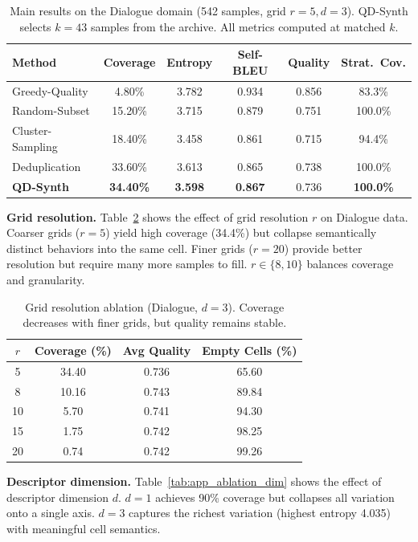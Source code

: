 \documentclass{article}
\begin{document}
\begin{enumerate}[nosep]
\begin{table}[h]
\centering
\caption{Main results on the Dialogue domain (542 samples, grid $r=5, d=3$). QD-Synth selects $k=43$ samples from the archive. All metrics computed at matched $k$.}
\label{tab:main_dialogue}
\begin{tabular}{lccccc}
\toprule
\textbf{Method} & \textbf{Coverage} & \textbf{Entropy} & \textbf{Self-BLEU} & \textbf{Quality} & \textbf{Strat.\ Cov.} \\
\midrule
Greedy-Quality & 4.80\% & 3.782 & 0.934 & 0.856 & 83.3\% \\
Random-Subset & 15.20\% & 3.715 & 0.879 & 0.751 & 100.0\% \\
Cluster-Sampling & 18.40\% & 3.458 & 0.861 & 0.715 & 94.4\% \\
Deduplication & 33.60\% & 3.613 & 0.865 & 0.738 & 100.0\% \\
\textbf{QD-Synth} & \textbf{34.40\%} & \textbf{3.598} & \textbf{0.867} & 0.736 & \textbf{100.0\%} \\
\bottomrule
\end{tabular}
\end{table}

\textbf{Grid resolution.}
Table~\ref{tab:app_ablation_grid} shows the effect of grid resolution $r$ on Dialogue data.
Coarser grids ($r{=}5$) yield high coverage (34.4\%) but collapse semantically distinct behaviors into the same cell.
Finer grids ($r{=}20$) provide better resolution but require many more samples to fill.
$r \in \{8, 10\}$ balances coverage and granularity.

\begin{table}[h]
\centering
\caption{Grid resolution ablation (Dialogue, $d=3$). Coverage decreases with finer grids, but quality remains stable.}
\label{tab:app_ablation_grid}
\begin{tabular}{cccc}
\toprule
$r$ & Coverage (\%) & Avg Quality & Empty Cells (\%) \\
\midrule
5 & 34.40 & 0.736 & 65.60 \\
8 & 10.16 & 0.743 & 89.84 \\
10 & 5.70 & 0.741 & 94.30 \\
15 & 1.75 & 0.742 & 98.25 \\
20 & 0.74 & 0.742 & 99.26 \\
\bottomrule
\end{tabular}
\end{table}

\textbf{Descriptor dimension.}
Table~\ref{tab:app_ablation_dim} shows the effect of descriptor dimension $d$.
$d{=}1$ achieves 90\% coverage but collapses all variation onto a single axis.
$d{=}3$ captures the richest variation (highest entropy 4.035) with meaningful cell semantics.


\end{enumerate}
\end{document}
